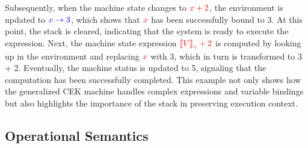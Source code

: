 \documentclass{l4proj}
\begin{document}
Subsequently, when the machine state changes to $\color{red}x + 2$, the environment is updated to $\color{blue}x \rightarrow 3$, which shows that $\color{red}x$ has been successfully bound to {\color{red}3}. At this point, the stack is cleared, indicating that the system is ready to execute the expression. Next, the machine state expression $\color{red}\text{\textlbrackdbl} V \text{\textrbrackdbl}_{\gamma} + 2$ is computed by looking up in the environment and replacing $\color{red}x$ with {\color{red}3}, which in turn is transformed to {\color{red}3} + {\color{red}2}. Eventually, the machine status is updated to {\color{red}5}, signaling that the computation has been successfully completed. This example not only shows how the generalized CEK machine handles complex expressions and variable bindings but also highlights the importance of the stack in preserving execution context.

\subsection{Operational Semantics}
\end{document}
